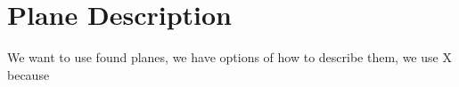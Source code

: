 \documentclass[main.tex]{subfiles}
\begin{document}
\section{Plane Description}
We want to use found planes, we have options of how to describe them, we use X because
\end{document}
